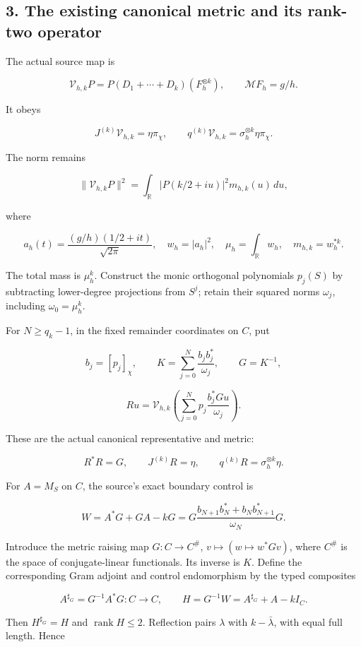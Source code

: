 \subsection{3. The existing canonical metric and its rank-two
operator}\label{exterior_trace:the-existing-canonical-metric-and-its-rank-two-operator}

The actual source map is

\[
\mathcal V_{h,k}P=P(D_1+\cdots+D_k)(F_h^{\otimes k}),
\qquad \mathcal MF_h=g/h.
\]

It obeys

\[
J^{(k)}\mathcal V_{h,k}=\eta\pi_\chi,
\qquad
q^{(k)}\mathcal V_{h,k}=\sigma_h^{\otimes k}\eta\pi_\chi.
\]

The norm remains

\[
\|\mathcal V_{h,k}P\|^2
=\int_{\mathbb R}|P(k/2+iu)|^2m_{h,k}(u)\,du,
\]

where

\[
a_h(t)=\frac{(g/h)(1/2+it)}{\sqrt{2\pi}},
\quad w_h=|a_h|^2,
\quad\mu_h=\int_{\mathbb R}w_h,
\quad m_{h,k}=w_h^{*k}.
\]

The total mass is \(\mu_h^k\). Construct the monic orthogonal
polynomials \(p_j(S)\) by subtracting lower-degree projections from
\(S^j\); retain their squared norms \(\omega_j\), including
\(\omega_0=\mu_h^k\).

For \(N\geq q_k-1\), in the fixed remainder coordinates on \(C\), put

\[
b_j=[p_j]_\chi,\qquad
K=\sum_{j=0}^{N}\frac{b_jb_j^*}{\omega_j},\qquad G=K^{-1},
\]

\[
R u=\mathcal V_{h,k}
\left(\sum_{j=0}^{N}p_j\frac{b_j^*Gu}{\omega_j}\right).
\]

These are the actual canonical representative and metric:

\[
R^*R=G,\qquad J^{(k)}R=\eta,\qquad
q^{(k)}R=\sigma_h^{\otimes k}\eta.
\]

For \(A=M_S\) on \(C\), the source's exact boundary control is

\[
\boxed{
W=A^*G+GA-kG
=G\frac{b_{N+1}b_N^*+b_Nb_{N+1}^*}{\omega_N}G.
}
\]

Introduce the metric raising map \(G:C\to C^\#\),
\(v\mapsto(w\mapsto w^*Gv)\), where \(C^\#\) is the space of
conjugate-linear functionals. Its inverse is \(K\). Define the
corresponding Gram adjoint and control endomorphism by the typed
composites

\[
A^{\sharp_G}=G^{-1}A^*G:C\to C,
\qquad
H=G^{-1}W=A^{\sharp_G}+A-kI_C.
\]

Then \(H^{\sharp_G}=H\) and \(\operatorname{rank}H\leq2\). Reflection
pairs \(\lambda\) with \(k-\bar\lambda\), with equal full length. Hence

